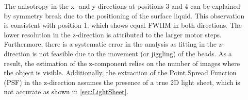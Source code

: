 The anisotropy in the x- and y-directions at positions 3 and 4 can be explained by symmetry break due to the positioning of the surface liquid. This observation is consistent with position 1, which shows equal FWHM in both directions. The lower resolution in the z-direction is attributed to the larger motor steps. Furthermore, there is a systematic error in the analysis as fitting in the z-direction is not feasible due to the movement (or jiggling) of the beads. As a result, the estimation of the z-component relies on the number of images where the object is visible. Additionally, the extraction of the Point Spread Function (PSF) in the z-direction assumes the presence of a true 2D light sheet, which is not accurate as shown in \cref{sec:LightSheet}.